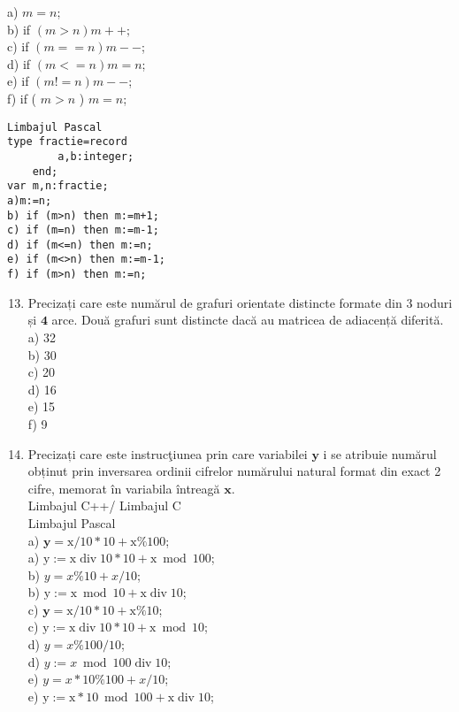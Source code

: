 a) $m=n$;\\
b) if $(m>n) m++;$\\
c) if $(m==n) m--$;\\
d) if $(m<=n) m=n$;\\
e) if $(m!=n) m--$;\\
f) if ( $m>n$ ) $m=n$;

\begin{verbatim}
Limbajul Pascal
type fractie=record
        a,b:integer;
    end;
var m,n:fractie;
a)m:=n;
b) if (m>n) then m:=m+1;
c) if (m=n) then m:=m-1;
d) if (m<=n) then m:=n;
e) if (m<>n) then m:=m-1;
f) if (m>n) then m:=n;
\end{verbatim}

\begin{enumerate}
  \setcounter{enumi}{12}
  \item Precizați care este numărul de grafuri orientate distincte formate din 3 noduri și $\mathbf{4}$ arce. Două grafuri sunt distincte dacă au matricea de adiacență diferită.\\
a) 32\\
b) 30\\
c) 20\\
d) 16\\
e) 15\\
f) 9
  \item Precizați care este instrucţiunea prin care variabilei $\mathbf{y}$ i se atribuie numărul obținut prin inversarea ordinii cifrelor numărului natural format din exact 2 cifre, memorat în variabila întreagă $\mathbf{x}$.\\
Limbajul C++/ Limbajul C\\
Limbajul Pascal\\
a) $\mathbf{y}=\mathrm{x} / 10 * 10+\mathrm{x} \% 100$;\\
a) $\mathrm{y}:=\mathrm{x} \operatorname{div} 10 * 10+\mathrm{x} \bmod 100$;\\
b) $y=x \% 10+x / 10$;\\
b) $\mathrm{y}:=\mathrm{x} \bmod 10+\mathrm{x} \operatorname{div} 10$;\\
c) $\mathbf{y}=\mathrm{x} / 10 * 10+\mathrm{x} \% 10$;\\
c) $\mathrm{y}:=\mathrm{x} \operatorname{div} 10 * 10+\mathrm{x} \bmod 10$;\\
d) $y=x \% 100 / 10$;\\
d) $y:=x \bmod 100 \operatorname{div} 10 ;$\\
e) $y=x * 10 \% 100+x / 10$;\\
e) $\mathrm{y}:=\mathrm{x} * 10 \bmod 100+\mathrm{x} \operatorname{div} 10$;\\

\end{enumerate}
